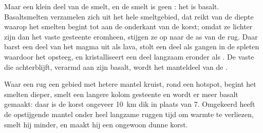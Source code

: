Maar een klein deel van de  smelt, en de smelt is geen :
het is basalt. Basaltsmelten verzamelen zich uit het hele smeltgebied, dat reikt van
de diepte waarop het smelten begint tot aan de onderkant van de korst; omdat ze
lichter zijn dan het vaste gesteente eromheen, stijgen ze op naar de as van de rug.
Daar barst een deel van het magma uit als lava, stolt een deel als gangen in de
spleten waardoor het opsteeg, en kristalliseert een deel langzaam eronder als .
De vaste  die achterblijft, verarmd aan zijn basalt, wordt het manteldeel
van de .

Waar een rug een gebied met hetere mantel kruist, rond een hotspot, begint het
smelten dieper, smelt een langere kolom gesteente en wordt er meer basalt gemaakt:
daar is de korst ongeveer \qty{10}{km} dik in plaats van 7. Omgekeerd heeft de
opstijgende mantel onder heel langzame ruggen tijd om warmte te verliezen, smelt
hij minder, en maakt hij een ongewoon dunne korst.

